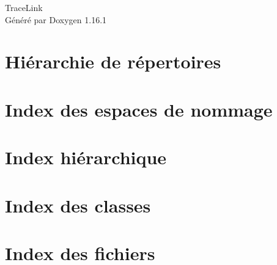\documentclass[twoside]{book}
\newcommand{\+}{\discretionary{\mbox{\scriptsize$\hookleftarrow$}}{}{}}
\newcommand{\clearemptydoublepage}{%
    \newpage{\pagestyle{empty}\cleardoublepage}%
  }
\begin{document}
  \raggedbottom
    \hypersetup{pageanchor=false,
                bookmarksnumbered=true,
                pdfencoding=unicode
               }
  \begin{titlepage}
  \vspace*{7cm}
  \begin{center}%
  {\Large Trace\+Link}\\
  \vspace*{1cm}
  {\large Généré par Doxygen 1.16.1}\\
  \end{center}
  \end{titlepage}
  \clearemptydoublepage
  \tableofcontents
  \clearemptydoublepage
  \hypersetup{pageanchor=true}
\chapter{Hiérarchie de répertoires}

\chapter{Index des espaces de nommage}

\chapter{Index hiérarchique}

\chapter{Index des classes}

\chapter{Index des fichiers}

\end{document}

